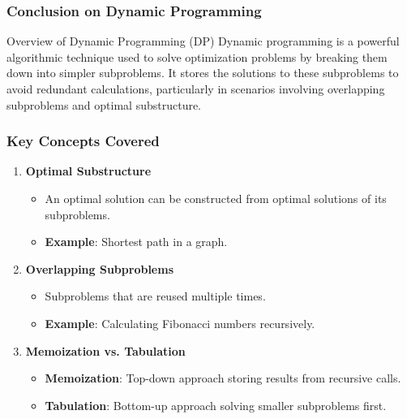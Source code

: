 \documentclass[aspectratio=169]{beamer}
\begin{document}
\begin{frame}[fragile]
    \frametitle{Conclusion on Dynamic Programming}
    
    \begin{block}{Overview of Dynamic Programming (DP)}
        Dynamic programming is a powerful algorithmic technique used to solve optimization problems by breaking them down into simpler subproblems. It stores the solutions to these subproblems to avoid redundant calculations, particularly in scenarios involving overlapping subproblems and optimal substructure.
    \end{block}
\end{frame}

\begin{frame}[fragile]
    \frametitle{Key Concepts Covered}
    
    \begin{enumerate}
        \item \textbf{Optimal Substructure}
        \begin{itemize}
            \item An optimal solution can be constructed from optimal solutions of its subproblems.
            \item \textbf{Example}: Shortest path in a graph.
        \end{itemize}

        \item \textbf{Overlapping Subproblems}
        \begin{itemize}
            \item Subproblems that are reused multiple times.
            \item \textbf{Example}: Calculating Fibonacci numbers recursively.
        \end{itemize}

        \item \textbf{Memoization vs. Tabulation}
        \begin{itemize}
            \item \textbf{Memoization}: Top-down approach storing results from recursive calls.
            \item \textbf{Tabulation}: Bottom-up approach solving smaller subproblems first.
        \end{itemize}
    \end{enumerate}
\end{frame}
\end{document}
